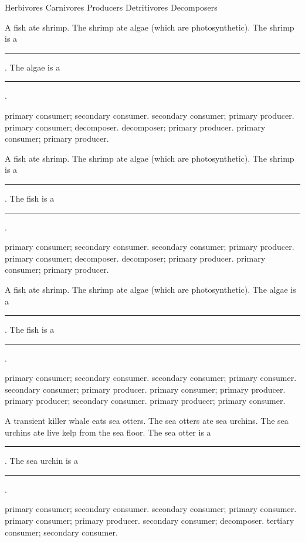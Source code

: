\begin{choices}
\choice Herbivores %
\choice Carnivores %
\correctchoice Producers %
\choice Detritivores %
\choice Decomposers %
\end{choices}

\question
A fish ate shrimp. The shrimp ate algae (which are photosynthetic).  The shrimp is a \rule{1in}{0.4pt}. The algae is a \rule{1in}{0.4pt}.

\begin{choices}	
\choice primary consumer; secondary consumer. %
\choice secondary consumer; primary producer. %
\choice primary consumer; decomposer. %
\choice decomposer; primary producer. %
\correctchoice primary consumer; primary producer. %
\end{choices}

\question
A fish ate shrimp. The shrimp ate algae (which are photosynthetic).  The shrimp is a \rule{1in}{0.4pt}. The fish is a \rule{1in}{0.4pt}.

\begin{choices}	
\correctchoice primary consumer; secondary consumer. %
\choice secondary consumer; primary producer. %
\choice primary consumer; decomposer. %
\choice decomposer; primary producer. %
\choice primary consumer; primary producer. %
\end{choices}

\question
A fish ate shrimp. The shrimp ate algae (which are photosynthetic).  The algae is a \rule{1in}{0.4pt}. The fish is a \rule{1in}{0.4pt}.

\begin{choices}	
\choice primary consumer; secondary consumer. %
\choice secondary consumer; primary consumer. %
\choice secondary consumer; primary producer. %
\choice primary consumer; primary producer. %
\correctchoice primary producer; secondary consumer. %
\choice primary producer; primary consumer. %
\end{choices}

\question
A transient killer whale eats sea otters. The sea otters ate sea urchins. The sea urchins ate live kelp from the sea floor.  The sea otter is a \rule{1in}{0.4pt}. The sea urchin is a \rule{1in}{0.4pt}.	

\begin{choices}
\choice primary consumer; secondary consumer. %
\correctchoice secondary consumer; primary consumer. %
\choice primary consumer; primary producer. %
\choice secondary consumer; decomposer. %
\choice tertiary consumer; secondary consumer. %
\end{choices}


